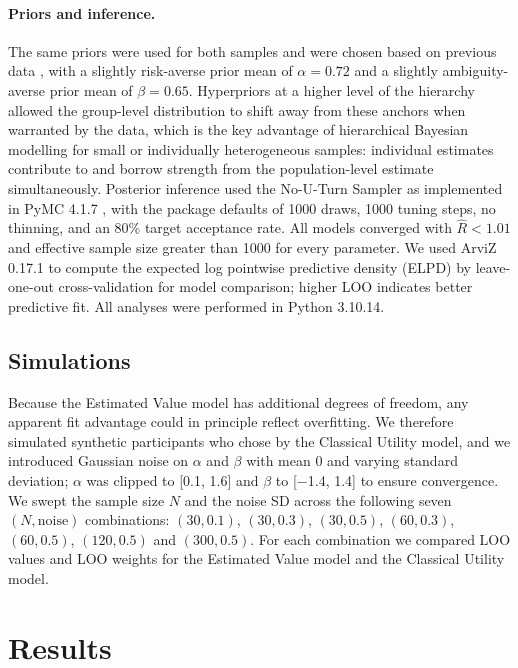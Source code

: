 \documentclass[11pt]{article}
\begin{document}
\paragraph{Priors and inference.} The same priors were used for both samples and were chosen based on previous data \citep{levy2012measuring}, with a slightly risk-averse prior mean of $\alpha = 0.72$ and a slightly ambiguity-averse prior mean of $\beta = 0.65$. Hyperpriors at a higher level of the hierarchy allowed the group-level distribution to shift away from these anchors when warranted by the data, which is the key advantage of hierarchical Bayesian modelling for small or individually heterogeneous samples: individual estimates contribute to and borrow strength from the population-level estimate simultaneously. Posterior inference used the No-U-Turn Sampler \citep{hoffman2014nuts} as implemented in PyMC 4.1.7 \citep{salvatier2016pymc3}, with the package defaults of 1000 draws, 1000 tuning steps, no thinning, and an 80\% target acceptance rate. All models converged with $\hat{R} < 1.01$ and effective sample size greater than 1000 for every parameter. We used ArviZ 0.17.1 \citep{kumar2019arviz} to compute the expected log pointwise predictive density (ELPD) by leave-one-out cross-validation \citep{vehtari2017loo} for model comparison; higher LOO indicates better predictive fit. All analyses were performed in Python 3.10.14.

\subsection{Simulations}

Because the Estimated Value model has additional degrees of freedom, any apparent fit advantage could in principle reflect overfitting. We therefore simulated synthetic participants who chose by the Classical Utility model, and we introduced Gaussian noise on $\alpha$ and $\beta$ with mean 0 and varying standard deviation; $\alpha$ was clipped to [0.1, 1.6] and $\beta$ to [$-$1.4, 1.4] to ensure convergence. We swept the sample size $N$ and the noise SD across the following seven $(N, \text{noise})$ combinations: $(30, 0.1)$, $(30, 0.3)$, $(30, 0.5)$, $(60, 0.3)$, $(60, 0.5)$, $(120, 0.5)$ and $(300, 0.5)$. For each combination we compared LOO values and LOO weights for the Estimated Value model and the Classical Utility model.

\section{Results}
\end{document}
